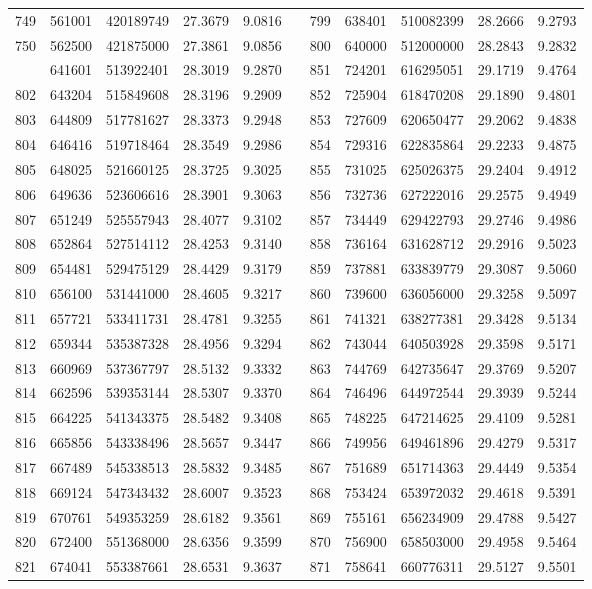 \begin{longtable}{rrrrrrrrrrr}
749&561001&420189749&27.3679&9.0816&&799&638401&510082399&28.2666&9.2793\\
750&562500&421875000&27.3861&9.0856&&800&640000&512000000&28.2843&9.2832\\
\newpage
801&641601&513922401&28.3019&9.2870&&851&724201&616295051&29.1719&9.4764\\
802&643204&515849608&28.3196&9.2909&&852&725904&618470208&29.1890&9.4801\\
803&644809&517781627&28.3373&9.2948&&853&727609&620650477&29.2062&9.4838\\
804&646416&519718464&28.3549&9.2986&&854&729316&622835864&29.2233&9.4875\\
805&648025&521660125&28.3725&9.3025&&855&731025&625026375&29.2404&9.4912\\
806&649636&523606616&28.3901&9.3063&&856&732736&627222016&29.2575&9.4949\\
807&651249&525557943&28.4077&9.3102&&857&734449&629422793&29.2746&9.4986\\
808&652864&527514112&28.4253&9.3140&&858&736164&631628712&29.2916&9.5023\\
809&654481&529475129&28.4429&9.3179&&859&737881&633839779&29.3087&9.5060\\
810&656100&531441000&28.4605&9.3217&&860&739600&636056000&29.3258&9.5097\\
811&657721&533411731&28.4781&9.3255&&861&741321&638277381&29.3428&9.5134\\
812&659344&535387328&28.4956&9.3294&&862&743044&640503928&29.3598&9.5171\\
813&660969&537367797&28.5132&9.3332&&863&744769&642735647&29.3769&9.5207\\
814&662596&539353144&28.5307&9.3370&&864&746496&644972544&29.3939&9.5244\\
815&664225&541343375&28.5482&9.3408&&865&748225&647214625&29.4109&9.5281\\
816&665856&543338496&28.5657&9.3447&&866&749956&649461896&29.4279&9.5317\\
817&667489&545338513&28.5832&9.3485&&867&751689&651714363&29.4449&9.5354\\
818&669124&547343432&28.6007&9.3523&&868&753424&653972032&29.4618&9.5391\\
819&670761&549353259&28.6182&9.3561&&869&755161&656234909&29.4788&9.5427\\
820&672400&551368000&28.6356&9.3599&&870&756900&658503000&29.4958&9.5464\\
821&674041&553387661&28.6531&9.3637&&871&758641&660776311&29.5127&9.5501\\

\end{longtable}
